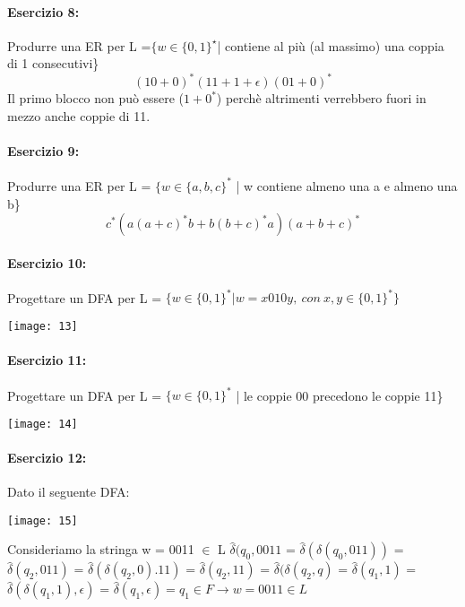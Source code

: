 \documentclass[12pt, a4paper, openany, oneside]{book}
\begin{document}
\paragraph{Esercizio 8: }Produrre una ER per L =$ \{w\in \{0,1\}^{\star} $| 
contiene al più (al massimo) una coppia di 1 consecutivi\}
\[
(10+0)^{*}(11+1+\epsilon)(01+0)^{*}
\]
Il primo blocco non può essere ($1+0^{*}$) perchè altrimenti verrebbero fuori in 
mezzo anche coppie di 11.
\paragraph{Esercizio 9: }
Produrre una ER per L = $\{w \in \{a,b,c\}^{*}$ | w contiene almeno una a e almeno
una b\}
\[
c^{*}(a(a+c)^{*}b+b(b+c)^{*}a)(a+b+c)^{*}
\]
\paragraph{Esercizio 10: }
Progettare un DFA per L = $\{w \in \{0,1\}^{*} | w = x010y, ~con~x,y\in\{0,1\}^{*}\}$ 
\begin{center}
\texttt{[image: 13]}
\end{center}
\paragraph{Esercizio 11:}
Progettare un DFA per L = $\{w \in \{0,1\}^{*}$ | le coppie 00 precedono le 
coppie 11\}
\begin{center}
\texttt{[image: 14]}
\end{center}
\paragraph{Esercizio 12:}

Dato il seguente DFA:
\begin{center}
\texttt{[image: 15]}
\end{center}
Consideriamo la stringa w = 0011 $\in$ L
$\widehat{\delta}(q_{0}, 0011$ = $\widehat{\delta}(\delta(q_{0},011))$ =
$\widehat{\delta}(q_{2},011)$ = $\widehat{\delta}(\delta(q_{2},0).11)$ = 
$\widehat{\delta}(q_{2},11)$ = $\widehat{\delta}(\delta(q_{2},q)$ = 
$\widehat{\delta}(q_{1},1)$ = $\widehat{\delta}(\delta(q_{1},1),\epsilon)$ = 
$\widehat{\delta}(q_{1}, \epsilon) = q_{1}\in F \to w = 0011 \in L$
\end{document}
